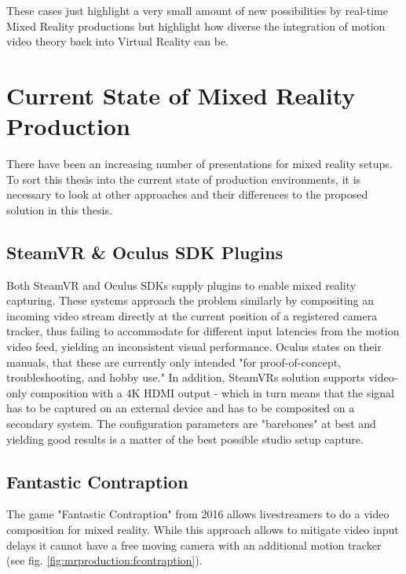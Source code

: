 These cases just highlight a very small amount of new possibilities by 
real-time Mixed Reality productions but highlight how diverse the integration 
of motion video theory back into Virtual Reality can be.

\section{Current State of Mixed Reality Production}

There have been an increasing number of presentations for mixed reality setups. 
To sort this thesis into the current state of production environments, it is 
necessary to look at other approaches and their differences to the proposed 
solution in this thesis.

\subsection{SteamVR \& Oculus SDK Plugins}

Both SteamVR and Oculus SDKs supply plugins to enable mixed reality capturing. 
These systems approach the problem similarly by compositing an incoming video 
stream directly at the current position of a registered camera tracker, thus 
failing to accommodate for different input latencies from the motion video 
feed, yielding an inconsistent visual performance. Oculus states on their 
manuals, that these are currently only intended "for proof-of-concept, 
troubleshooting, and hobby use." \cite{oculus:mr-setup:2017}
\newline
In addition, SteamVRs solution supports video-only composition with a 4K 
HDMI output - which in turn means that the signal has to be captured on an 
external device and has to be composited on a secondary system. The 
configuration parameters are "barebones" at best and yielding good results is a 
matter of the best possible studio setup capture.

\subsection{Fantastic Contraption}

The game "Fantastic Contraption" from 2016 allows livestreamers to do a video 
composition for mixed reality. While this approach allows to mitigate video 
input delays it cannot have a free moving camera with an additional motion 
tracker (see fig. \ref{fig:mrproduction:fcontraption}).


